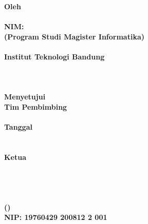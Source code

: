 \clearpage
{}

\begin{spacing}{1}
\begin{center}
  \smallskip
  \large \bfseries \MakeUppercase{\Title}\\
  \hfill\\
  \hfill\\
  \normalsize \normalfont Oleh\\
  \large \bfseries \AuthorName\\
  NIM:~\MakeUppercase{\AuthorNIM}\\
  \normalsize (Program Studi Magister Informatika)\\
  \hfill\\
  \normalsize \normalfont Institut Teknologi Bandung \\
  \hfill\\
  \hfill\\
  \hfill\\
  Menyetujui\\
  Tim Pembimbing\\
  \hfill\\
  Tanggal \ThesisDate \\
  \hfill\\
  \hfill\\
  Ketua\\
  \hfill\\
  \hfill\\
  \hfill\\
  \hfill\\
  (\SupervisorName)\\
  NIP: 19760429 200812 2 001
\end{center}
\end{spacing}
